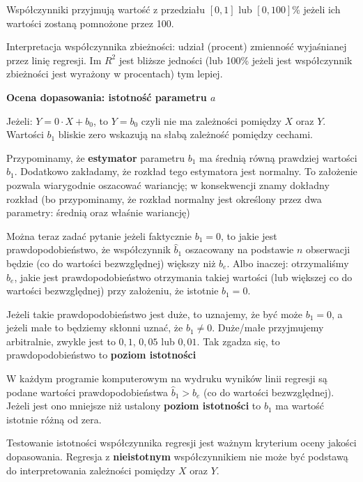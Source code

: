 \documentclass[
  openany]{book}
\begin{document}
Współczynniki przyjmują wartość z przedziału \([0,1]\) lub \([0, 100]\)\% jeżeli
ich wartości zostaną pomnożone przez 100.

Interpretacja współczynnika zbieżności: udział (procent) zmienność wyjaśnianej
przez linię regresji. Im \(R^2\) jest bliższe jedności (lub 100\% jeżeli
jest współczynnik zbieżności jest wyrażony w procentach) tym lepiej.

\textbf{Ocena dopasowania: istotność parametru \(a\)}

Jeżeli: \(Y= 0 \cdot X + b_0\), to \(Y = b_0\) czyli nie ma zależności
pomiędzy \(X\) oraz \(Y\).
Wartości \(b_1\) bliskie zero wskazują na słabą zależność
pomiędzy cechami.

Przypominamy, że \textbf{estymator} parametru \(b_1\) ma średnią równą prawdziej wartości \(b_1\).
Dodatkowo zakładamy, że rozkład tego estymatora jest normalny. To założenie
pozwala wiarygodnie oszacować wariancję; w konsekwencji znamy dokładny
rozkład (bo przypominamy, że rozkład
normalny jest określony przez dwa parametry: średnią oraz właśnie wariancję)

Można teraz zadać pytanie jeżeli faktycznie \(b_1=0\), to jakie jest prawdopodobieństwo, że
współczynnik \(\hat b_1\) oszacowany
na podstawie \(n\) obserwacji będzie (co do wartości bezwzględnej) większy niż \(b_e\).
Albo inaczej: otrzymaliśmy \(b_e\), jakie jest prawdopodobieństwo
otrzymania takiej wartości (lub większej co do wartości bezwzględnej)
przy założeniu, że istotnie \(b_1=0\).

Jeżeli takie prawdopodobieństwo jest duże, to uznajemy, że być może \(b_1 = 0\),
a jeżeli małe to będziemy skłonni uznać, że \(b_1 \not= 0\).
Duże/małe przyjmujemy arbitralnie, zwykle
jest to \(0,1\), \(0,05\) lub \(0,01\). Tak zgadza się, to prawdopodobieństwo
to \textbf{poziom istotności}

W każdym programie komputerowym na wydruku wyników linii regresji są podane wartości
prawdopodobieństwa \(\hat b_1 > b_e\) (co do wartości bezwzględnej). Jeżeli jest
ono mniejsze
niż ustalony \textbf{poziom istotności} to \(b_1\) ma wartość istotnie różną od zera.

Testowanie istotności współczynnika regresji jest ważnym kryterium oceny
jakości dopasowania.
Regresja z \textbf{nieistotnym} współczynnikiem nie
może być podstawą do interpretowania zależności pomiędzy \(X\) oraz \(Y\).
\end{document}
